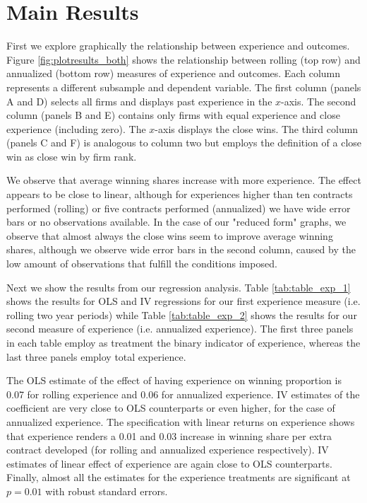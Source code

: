 \section{Main Results}

First we explore graphically the relationship between experience and outcomes. Figure \ref{fig:plotresults_both} shows the relationship between rolling (top row) and annualized (bottom row) measures of experience and outcomes.  Each column represents a different subsample and dependent variable. The first column (panels A and D) selects all firms and displays past experience in the $x$-axis. The second column (panels B and E) contains only firms with equal experience and close experience (including zero). The $x$-axis displays the close wins. The third column (panels C and F) is analogous to column two but employs the definition of a close win as close win by firm rank.

We observe that average winning shares increase with more experience. The effect appears to be close to linear, although for experiences higher than ten contracts performed (rolling) or five contracts performed (annualized) we have wide error bars or no observations available. In the case of our "reduced form" graphs, we observe that almost always the close wins seem to improve average winning shares, although we observe wide error bars in the second column, caused by the low amount of observations that fulfill the conditions imposed.

Next we show the results from our regression analysis. Table \ref{tab:table_exp_1} shows the results for OLS and IV regressions for our first experience measure (i.e. rolling two year periods) while Table \ref{tab:table_exp_2} shows the results for our second measure of experience (i.e. annualized experience). The first three panels in each table employ as treatment the binary indicator of experience, whereas the last three panels employ total experience.

The OLS estimate of the effect of having experience on winning proportion is 0.07 for rolling experience and 0.06 for annualized experience. IV estimates of the coefficient are very close to OLS counterparts or even higher, for the case of annualized experience. The specification with linear returns on experience shows that experience renders a 0.01 and 0.03 increase in winning share per extra contract developed (for rolling and annualized experience respectively). IV estimates of linear effect of experience are again close to OLS counterparts. Finally, almost all the estimates for the experience treatments are significant at $p=0.01$ with robust standard errors.

